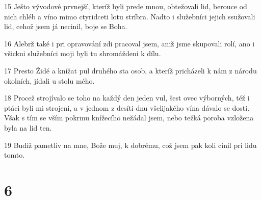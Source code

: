 \par 15 Ješto vývodové prvnejší, kteríž byli prede mnou, obtežovali lid, berouce od nich chléb a víno mimo ctyridceti lotu stríbra. Nadto i služebníci jejich ssužovali lid, cehož jsem já necinil, boje se Boha.
\par 16 Alebrž také i pri opravování zdi pracoval jsem, aniž jsme skupovali rolí, ano i všickni služebníci moji byli tu shromáždeni k dílu.
\par 17 Presto Židé a knížat pul druhého sta osob, a kteríž pricházeli k nám z národu okolních, jídali u stolu mého.
\par 18 Procež strojívalo se toho na každý den jeden vul, šest ovec výborných, též i ptáci byli mi strojeni, a v jednom z desíti dnu všelijakého vína dávalo se dosti. Však s tím se vším pokrmu knížecího nežádal jsem, nebo težká poroba vzložena byla na lid ten.
\par 19 Budiž pametliv na mne, Bože muj, k dobrému, což jsem pak koli cinil pri lidu tomto.

\chapter{6}

